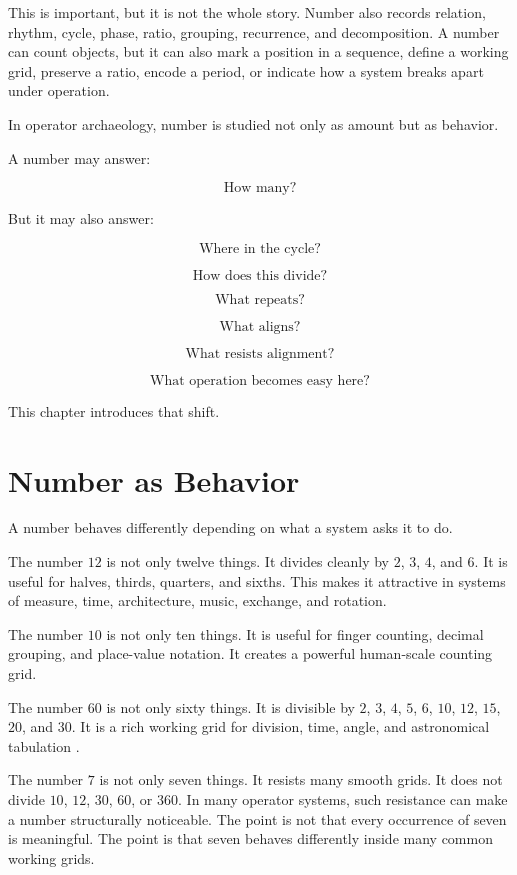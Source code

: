 \documentclass[11pt]{book}
\begin{document}
This is important, but it is not the whole story. Number also records relation, rhythm, cycle, phase, ratio, grouping, recurrence, and decomposition. A number can count objects, but it can also mark a position in a sequence, define a working grid, preserve a ratio, encode a period, or indicate how a system breaks apart under operation.

In operator archaeology, number is studied not only as amount but as behavior.

A number may answer:

\[
\text{How many?}
\]

But it may also answer:

\[
\text{Where in the cycle?}
\]

\[
\text{How does this divide?}
\]

\[
\text{What repeats?}
\]

\[
\text{What aligns?}
\]

\[
\text{What resists alignment?}
\]

\[
\text{What operation becomes easy here?}
\]

This chapter introduces that shift.

\section{Number as Behavior}

A number behaves differently depending on what a system asks it to do.

The number \(12\) is not only twelve things. It divides cleanly by \(2\), \(3\), \(4\), and \(6\). It is useful for halves, thirds, quarters, and sixths. This makes it attractive in systems of measure, time, architecture, music, exchange, and rotation.

The number \(10\) is not only ten things. It is useful for finger counting, decimal grouping, and place-value notation. It creates a powerful human-scale counting grid.


The number \(60\) is not only sixty things. It is divisible by \(2\), \(3\), \(4\), \(5\), \(6\), \(10\), \(12\), \(15\), \(20\), and \(30\). It is a rich working grid for division, time, angle, and astronomical tabulation \cite{Neugebauer1957ExactSciences,Robson2008MathematicsAncientIraq,HungerPingree1999AstralSciences}.

The number \(7\) is not only seven things. It resists many smooth grids. It does not divide \(10\), \(12\), \(30\), \(60\), or \(360\). In many operator systems, such resistance can make a number structurally noticeable. The point is not that every occurrence of seven is meaningful. The point is that seven behaves differently inside many common working grids.
\end{document}
